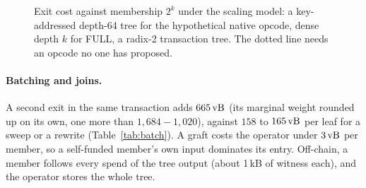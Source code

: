 \iffullversion
\begin{figure}[tbp]
\centering
{}
\caption{Exit cost against membership $2^k$ under the scaling model: a key-addressed depth-64 tree for the hypothetical native opcode, dense depth $k$ for FULL, a radix-2 transaction tree. The dotted line needs an opcode no one has proposed.}
\label{fig:scale}
\end{figure}
\fi

\iffullversion


\paragraph{Batching and joins.} A second exit in the same transaction
adds $665\,\mathrm{vB}$ (its marginal weight rounded up on its own, one more than
$1{,}684 - 1{,}020$), against $158$ to $165\,\mathrm{vB}$ per leaf for a sweep or
a rewrite (Table~\ref{tab:batch}). A graft
costs the operator under $3\,\mathrm{vB}$ per member, so a self-funded member's own
input dominates its entry. Off-chain, a member follows every spend of the
tree output (about 1\,kB of witness each), and the operator stores the
whole tree.
\fi

